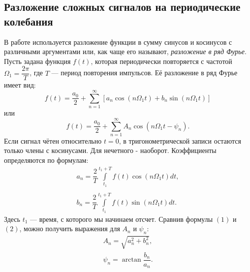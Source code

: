 \documentclass[a4paper,11pt]{extarticle}
\begin{document}
\subsection*{Разложение сложных сигналов на периодические колебания}
В работе используется разложение функции в сумму синусов и косинусов с различными аргументами или, как чаще его называют, \textit{разложение в ряд Фурье}.
\n\n
Пусть задана функция $f(t)$, которая периодически повторяется с частотой $\Omega_1 = \dfrac{2\pi}{T}$, где $T$ --- период повторения импульсов. Её разложение в ряд Фурье имеет вид:
\begin{equation}
f(t) = \dfrac{a_0}{2} + \sum\limits_{n = 1}^{\infty}\left[a_n \cos \left(n \Omega_1t\right) + b_n \sin \left(n \Omega_1t\right)\right]
\end{equation}
или
\begin{equation}
f(t) = \dfrac{a_0}{2} + \sum\limits_{n = 1}^{\infty}A_n \cos \left(n\Omega_1t-\psi_n\right).
\end{equation}
Если сигнал чётен относительно $t=0$, в тригонометрической записи остаются только члены с косинусами. Для нечетного - наоборот.
\n\n
Коэффициенты определяются по формулам:
\begin{equation}
\begin{array}{c}
a_n  = \dfrac{2}{T}\int\limits_{t_1}^{t_1+T}f(t)\cos\left(n \Omega_1 t\right) dt,\\
\\
b_n = \dfrac{2}{T}\int\limits_{t_1}^{t_1+T}f(t)\sin\left(n \Omega_1 t\right) dt.
\end{array}
\end{equation}
Здесь $t_1$ --- время, с которого мы начинаем отсчет.
\n\n
Сравнив формулы $(1)$ и $(2)$, можно получить выражения для $A_n$  и $\psi_n$:
\begin{equation}
\begin{array}{l}
A_n = \sqrt{a_n^2+b_n^2},\\
 \psi_n = \arctan \dfrac{b_n}{a_n}.
\end{array}
\end{equation}
\end{document}
